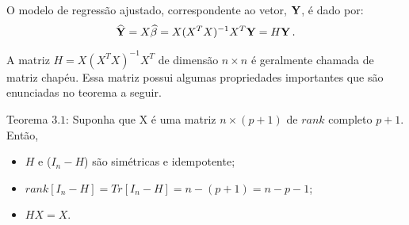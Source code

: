 \documentclass[]{article}
\begin{document}
O modelo de regressão ajustado, correspondente ao vetor, \({ \bf Y}\), é
dado por:
\[\widehat{{ \bf Y}} = X\widehat{{ \bf \beta}} = X(X^TX)^{-1}X^T{ \bf Y} = H{ \bf Y}\,.\]

A matriz \(H = X(X^TX)^{-1}X^T\) de dimensão \(n \times n\) é geralmente
chamada de matriz chapéu. Essa matriz possui algumas propriedades
importantes que são enunciadas no teorema a seguir.

Teorema \(3.1\): Suponha que X é uma matriz \(n \times (p+1)\) de
\(rank\) completo \(p+1\). Então,

\begin{itemize}
\item
  \(H\) e (\(I_n - H\)) são simétricas e idempotente;
\item
  \(rank[I_n - H] = Tr[I_n - H] = n-(p+1) = n-p-1\);
\item
  \(HX = X\).
\end{itemize}
\end{document}
